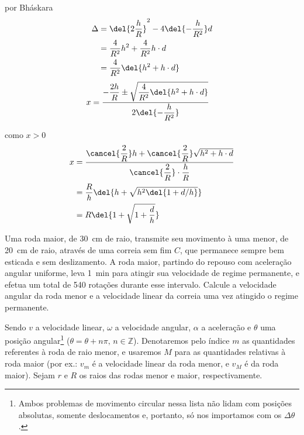 \documentclass[]{IMTexam}
\begin{document}
\begin{questions}
\begin{solution}
		\begin{multi}[2][t]

			por Bháskara
			\begin{align*}
				\Delta & =\del{2\dfrac{h}{R}}^{2}-4\del{-\dfrac{h}{R^{2}}}d \\
				       & =\dfrac{4}{R^{2}}h^{2}+\dfrac{4}{R^{2}}h\cdot d    \\
				       & =\dfrac{4}{R^{2}}\del{h^{2}+h\cdot d}
			\end{align*}
			\begin{align*}
				x & =\dfrac{-\dfrac{2h}{R}\pm\sqrt{\dfrac{4}{R^{2}}\del{h^{2}+h\cdot d}}}{2\del{-\dfrac{h}{R^{2}}}}
			\end{align*}

			\nextcol
			como $ x>0 $
			\begin{align*}
				x & =\dfrac{\cancel{\dfrac{2}{R}}h+\cancel{\dfrac{2}{R}}\sqrt{h^{2}+h\cdot d}}{\cancel{\dfrac{2}{R}}\cdot\dfrac{h}{R}} \\
				  & =\dfrac{R}{h}\del{h+\sqrt{h^{2}\del{1+d/h}}}                                                                       \\
				  & =R\del{1+\sqrt{1+\dfrac{d}{h}}}
			\end{align*}
		\end{multi}
	\end{solution}



	\question
	Uma roda maior, de \SI{30}{\centi\meter} de raio, transmite seu movimento à uma menor, de \SI{20}{\centi\meter} de raio, através de uma correia sem fim $ C $, que permanece sempre bem esticada e sem deslizamento. A roda maior, partindo do repouso com aceleração angular uniforme, leva \SI{1}{\minute} para atingir sua velocidade de regime permanente, e efetua um total de 540 rotações durante esse intervalo. Calcule a velocidade angular da roda menor e a velocidade linear da correia uma vez atingido o regime permanente.

	\begin{solution}

		\begin{multi}
			Sendo $ v $ a velocidade linear, $ \omega $ a velocidade angular, $ \alpha $ a aceleração e $ \theta $ uma posição angular\footnote{Ambos problemas de movimento circular nessa lista não lidam com posições absolutas, somente deslocamentos e, portanto, só nos importamos com os $ \Delta\theta $.} ($ \theta=\theta+n\pi,\, n\in \mathbb{Z}$). Denotaremos pelo índice $ m $ as quantidades referentes à roda de raio menor, e usaremos $ M $ para as quantidades relativas à roda maior (por ex.: $ v_m $ é a velocidade linear da roda menor, e $ v_M $ é da roda maior).
			Sejam $ r $ e $ R $ os raios das rodas menor e maior, respectivamente.


\end{multi}
\end{solution}
\end{questions}
\end{document}

